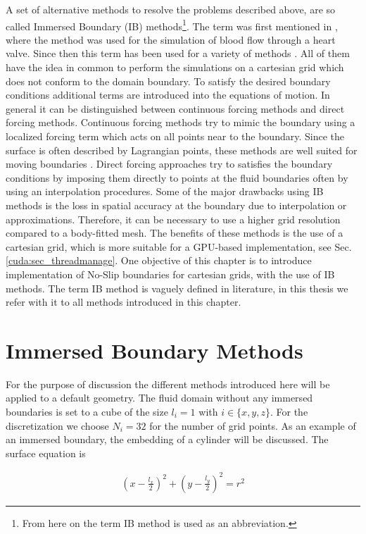 A set of alternative methods to resolve the problems described above, are so called Immersed Boundary (IB) methods\footnote{From here on the term IB method is used as an abbreviation.}.
The term was first mentioned in \citep{peskin72}, where the method was used for the simulation of blood flow through a heart valve.
Since then this term has been used for a variety of methods \citep{Mittal2005}.
All of them have the idea in common to perform the simulations on a cartesian grid which does not conform to the domain boundary.
To satisfy the desired boundary conditions additional terms are introduced into the equations of motion.
In general it can be distinguished between continuous forcing methods and direct forcing methods.
Continuous forcing methods try to mimic the boundary using a localized forcing term which acts on all points near to the boundary.
Since the surface is often described by Lagrangian points, these methods are well suited for moving boundaries \citep{Mittal2005}.
Direct forcing approaches try to satisfies the boundary conditions by imposing them directly to points at the fluid boundaries  often by using  an interpolation procedures.
Some of the major drawbacks using IB methods is the loss in  spatial accuracy at the boundary due to interpolation or approximations.
Therefore, it can be necessary to use a higher grid resolution
compared to a body-fitted mesh.
The benefits of these methods is the use of a cartesian grid, which is more suitable for a GPU-based implementation, see Sec. \ref{cuda:sec_threadmanage}.
One objective of this chapter is to introduce implementation of No-Slip boundaries for cartesian grids, with the use of IB methods.
The term IB method is vaguely defined in literature, in this thesis we refer with it to all methods introduced in this chapter.

\section{Immersed Boundary Methods}

For the purpose of discussion the different methods introduced here will be applied to a default geometry.
The fluid domain without any immersed boundaries is set to a cube of the size $l_i= 1$ with  $i \in \{x, y, z\}$.
For the discretization we choose $N_i = 32$ for the number of grid points.
As an example of an immersed boundary, the embedding of a cylinder will be discussed. The  surface equation is

\begin{align}
    \label{ibm:eq_cylinder_intro}
    \left(x - \frac{l_x}{2}\right)^2 + \left(y - \frac{l_y}{2}\right)^2 = r^2
\end{align}

